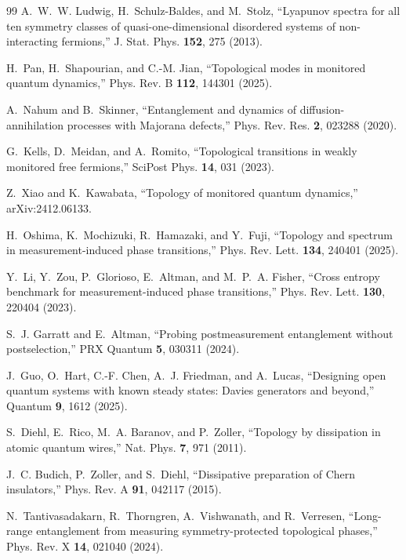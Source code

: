 \documentclass[aps,prl,twocolumn,floatfix,superscriptaddress,nofootinbib]{revtex4-2}
\begin{document}
\begin{thebibliography}{99}
A.~W.~W. Ludwig, H.~Schulz-Baldes, and M.~Stolz,
``Lyapunov spectra for all ten symmetry classes of quasi-one-dimensional disordered systems of non-interacting fermions,''
J. Stat. Phys. \textbf{152}, 275 (2013).

H.~Pan, H.~Shapourian, and C.-M. Jian,
``Topological modes in monitored quantum dynamics,''
Phys. Rev. B \textbf{112}, 144301 (2025).

A.~Nahum and B.~Skinner,
``Entanglement and dynamics of diffusion-annihilation processes with Majorana defects,''
Phys. Rev. Res. \textbf{2}, 023288 (2020).

G.~Kells, D.~Meidan, and A.~Romito,
``Topological transitions in weakly monitored free fermions,''
SciPost Phys. \textbf{14}, 031 (2023).

Z.~Xiao and K.~Kawabata,
``Topology of monitored quantum dynamics,''
arXiv:2412.06133.

H.~Oshima, K.~Mochizuki, R.~Hamazaki, and Y.~Fuji,
``Topology and spectrum in measurement-induced phase transitions,''
Phys. Rev. Lett. \textbf{134}, 240401 (2025).

Y.~Li, Y.~Zou, P.~Glorioso, E.~Altman, and M.~P.~A. Fisher,
``Cross entropy benchmark for measurement-induced phase transitions,''
Phys. Rev. Lett. \textbf{130}, 220404 (2023).

S.~J. Garratt and E.~Altman,
``Probing postmeasurement entanglement without postselection,''
PRX Quantum \textbf{5}, 030311 (2024).

J.~Guo, O.~Hart, C.-F. Chen, A.~J. Friedman, and A.~Lucas,
``Designing open quantum systems with known steady states: Davies generators and beyond,''
Quantum \textbf{9}, 1612 (2025).

S.~Diehl, E.~Rico, M.~A. Baranov, and P.~Zoller,
``Topology by dissipation in atomic quantum wires,''
Nat. Phys. \textbf{7}, 971 (2011).

J.~C. Budich, P.~Zoller, and S.~Diehl,
``Dissipative preparation of Chern insulators,''
Phys. Rev. A \textbf{91}, 042117 (2015).

N.~Tantivasadakarn, R.~Thorngren, A.~Vishwanath, and R.~Verresen,
``Long-range entanglement from measuring symmetry-protected topological phases,''
Phys. Rev. X \textbf{14}, 021040 (2024).


\end{thebibliography}
\end{document}
